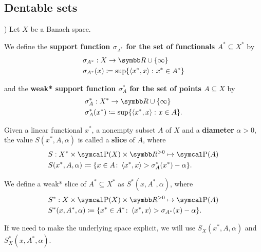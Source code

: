 \subsection{Dentable sets}\label{sec:dentable_sets}

\begin{definition}\cite[Example 3.2(a]{Phelps1993})
  \label{def:banach_support_function}
  Let \( X \) be a Banach space.

  We define the \textbf{support function \( \sigma_{A^*} \) for the set of functionals \( A^* \subseteq X^* \)} by
  \begin{align*}
    &\sigma_{A^*}: X \to \BB{R} \cup \{ \infty \} \\
    &\sigma_{A^*}(x) \coloneqq \sup \{ \Prod {x^*} x \colon x^* \in A^* \}
  \end{align*}

  and the \textbf{weak* support function \( \sigma^*_A \) for the set of points \( A \subseteq X \)} by
  \begin{align*}
    &\sigma^*_A: X^* \to \BB{R} \cup \{ \infty \} \\
    &\sigma^*_A(x^*) \coloneqq \sup \{ \Prod {x^*} x \colon x \in A \}.
  \end{align*}
\end{definition}

\begin{definition}\cite[definition 2.17]{Phelps1993}
  \label{def:banach_slice}
  Given a linear functional \( x^* \), a nonempty subset \( A \) of \( X \) and a \textbf{diameter} \( \alpha > 0 \), the value \( S(x^*, A, \alpha) \) is called a \textbf{slice} of \( A \), where
  \begin{align*}
    &S: X^* \times \Power(X) \times \BB{R}^{>0} \mapsto \Power(A) \\
    &S(x^*, A, \alpha) \coloneqq \{ x \in A \colon \Prod {x^*} x > \sigma_A^*(x^*) - \alpha \}.
  \end{align*}

  We define a weak* slice of \( A^* \subseteq X^* \) as \( S^*(x, A^*, \alpha) \), where
  \begin{align*}
    &S^*: X \times \Power(X) \times \BB{R}^{>0} \mapsto \Power(A) \\
    &S^*(x, A^*, \alpha) \coloneqq \{ x^* \in A^* \colon \Prod {x^*} x > \sigma_{A^*}(x) - \alpha \}.
  \end{align*}

  If we need to make the underlying space explicit, we will use \( S_X(x^*, A, \alpha) \) and \( S_X^*(x, A^*, \alpha) \).
\end{definition}

